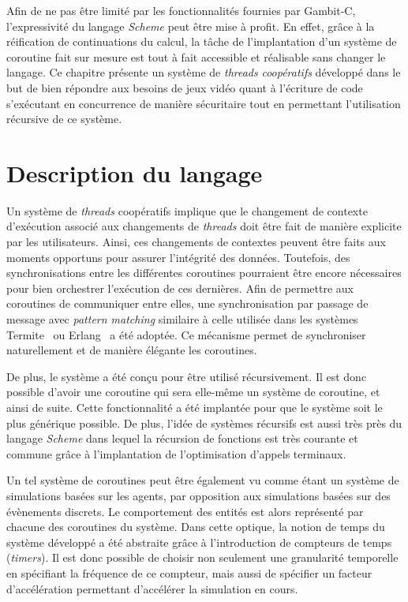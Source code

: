 \documentclass[12pt,twoside,letterpaper,francais]{book}
\newcommand{\Schemelang}{{\textit{Scheme }}}
\begin{document}
Afin de ne pas être limité par les fonctionnalités fournies par
Gambit-C, l'expressivité du langage \Schemelang peut être mise à
profit. En effet, grâce à la réification de continuations du calcul,
la tâche de l'implantation d'un système de coroutine fait sur mesure
est tout à fait accessible et réalisable sans changer le langage. Ce
chapitre présente un système de \textit{threads} \emph{coopératifs}
développé dans le but de bien répondre aux besoins de jeux vidéo quant
à l'écriture de code s'exécutant en concurrence de manière sécuritaire
tout en permettant l'utilisation récursive de ce système.


\FloatBarrier
\section{Description du langage}
Un système de \textit{threads} coopératifs implique que le changement
de contexte d'exécution associé aux changements de \textit{threads}
doit être fait de manière explicite par les utilisateurs. Ainsi, ces
changements de contextes peuvent être faits aux moments opportuns pour
assurer l'intégrité des données. Toutefois, des synchronisations entre
les différentes coroutines pourraient être encore nécessaires pour
bien orchestrer l'exécution de ces dernières. Afin de permettre aux
coroutines de communiquer entre elles, une synchronisation par passage
de message avec \textit{pattern matching} similaire à celle utilisée
dans les systèmes Termite~\cite{Termite_paper} ou Erlang~\cite{Erlang}
a été adoptée. Ce mécanisme permet de synchroniser naturellement et de
manière élégante les coroutines.

De plus, le système a été conçu pour être utilisé récursivement. Il
est donc possible d'avoir une coroutine qui sera elle-même un système
de coroutine, et ainsi de suite. Cette fonctionnalité a été implantée
pour que le système soit le plus générique possible. De plus, l'idée
de systèmes récursifs est aussi très près du langage \Schemelang dans
lequel la récursion de fonctions est très courante et commune grâce à
l'implantation de l'optimisation d'appels terminaux.

Un tel système de coroutines peut être également vu comme étant un
système de simulations basées sur les agents, par opposition aux
simulations basées sur des évènements discrets. Le comportement des
entités est alors représenté par chacune des coroutines du
système. Dans cette optique, la notion de temps du système développé a
été abstraite grâce à l'introduction de compteurs de temps
(\textit{timers}). Il est donc possible de choisir non seulement une
granularité temporelle en spécifiant la fréquence de ce compteur, mais
aussi de spécifier un facteur d'accélération permettant d'accélérer la
simulation en cours.
\end{document}
